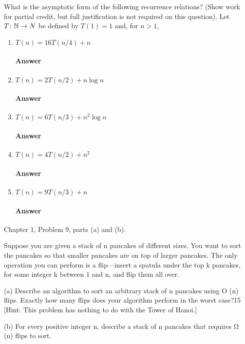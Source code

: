 \documentclass{article}
\begin{document}
What is the asymptotic form of the following recurrence
relations? (Show work for partial credit, but full justification is not required
on this question).
Let $T \colon {\mathbb N} \to N$ be defined by $T(1)=1$ and, for $n>1$,
\begin{enumerate}
	\item $T(n) = 16 T(n/4) + n$
	      \paragraph{Answer} \todo{}
	\item $T(n) = 2 T(n/2) + n \log{n}$
	      \paragraph{Answer} \todo{}
	\item $T(n) = 6 T(n/3) + n^2 \log{n}$
	      \paragraph{Answer} \todo{}
	\item $T(n) = 4 T(n/2) + n^2$
	      \paragraph{Answer} \todo{}
	\item $T(n) = 9 T(n/3) + n$
	      \paragraph{Answer} \todo{}
\end{enumerate}


\collab{\todo{}}

Chapter 1, Problem 9, parts (a) and (b).

Suppose you are given a stack of n pancakes of different sizes. You want to
sort the pancakes so that smaller pancakes are on top of larger pancakes.
The only operation you can perform is a flip—insert a spatula under the
top k pancakes, for some integer k between 1 and n, and flip them all over.

(a) Describe an algorithm to sort an arbitrary stack of n pancakes using
O (n) flips. Exactly how many flips does your algorithm perform in the
worst case?15 [Hint: This problem has nothing to do with the Tower of
Hanoi.]

(b) For every positive integer n, describe a stack of n pancakes that requires
Ω (n) flips to sort.
\end{document}

